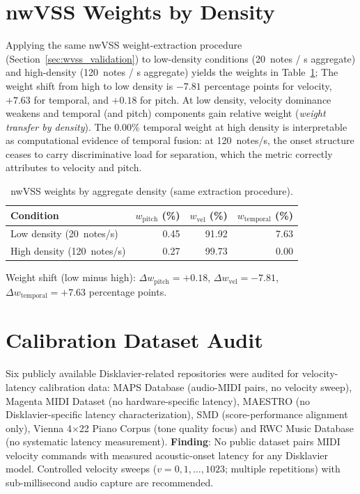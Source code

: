 \documentclass[a4paper]{article}
\newcommand{\tbl}[2]{\caption{#1}\centering#2}
\newcommand{\tabnote}[1]{\par\vspace{0.5ex}\footnotesize#1}
\theoremstyle{definition}
\theoremstyle{remark}
\begin{document}
\section{nwVSS Weights by Density}
\label{app:nwvss_density}

Applying the same nwVSS weight-extraction procedure (Section~\ref{sec:wvss_validation}) to low-density conditions (20~notes / s aggregate) and high-density (120~notes / s aggregate) yields the weights in Table~\ref{tab:nwvss_density};  The weight shift from high to low density is $-7.81$ percentage points for velocity, $+7.63$ for temporal, and $+0.18$ for pitch. At low density, velocity dominance weakens and temporal (and pitch) components gain relative weight (\emph{weight transfer by density}). The 0.00\% temporal weight at high density is interpretable as computational evidence of temporal fusion: at 120~notes/s, the onset structure ceases to carry discriminative load for separation, which the metric correctly attributes to velocity and pitch.

\begin{table}[htbp]
\tbl{nwVSS weights by aggregate density (same extraction procedure).}
{\begin{tabular}{@{}lrrr@{}} \toprule
Condition & $w_{\text{pitch}}$ (\%) & $w_{\text{vel}}$ (\%) & $w_{\text{temporal}}$ (\%) \\ \midrule
Low density (20~notes/s) & 0.45 & 91.92 & 7.63 \\
High density (120~notes/s) & 0.27 & 99.73 & 0.00 \\ \bottomrule
\end{tabular}}
\tabnote{Weight shift (low minus high): $\Delta w_{\text{pitch}} = +0.18$, $\Delta w_{\text{vel}} = -7.81$, $\Delta w_{\text{temporal}} = +7.63$ percentage points.}
\label{tab:nwvss_density}
\end{table}


\section{Calibration Dataset Audit}
\label{app:audit}

Six publicly available Disklavier-related repositories were audited for velocity-latency calibration data: MAPS Database (audio-MIDI pairs, no velocity sweep), Magenta MIDI Dataset (no hardware-specific latency), MAESTRO (no Disklavier-specific latency characterization), SMD (score-performance alignment only), Vienna 4$\times$22 Piano Corpus (tone quality focus) and RWC Music Database (no systematic latency measurement). \textbf{Finding}: No public dataset pairs MIDI velocity commands with measured acoustic-onset latency for any Disklavier model. Controlled velocity sweeps ($v = 0, 1, \ldots, 1023$; multiple repetitions) with sub-millisecond audio capture are recommended.
\end{document}
